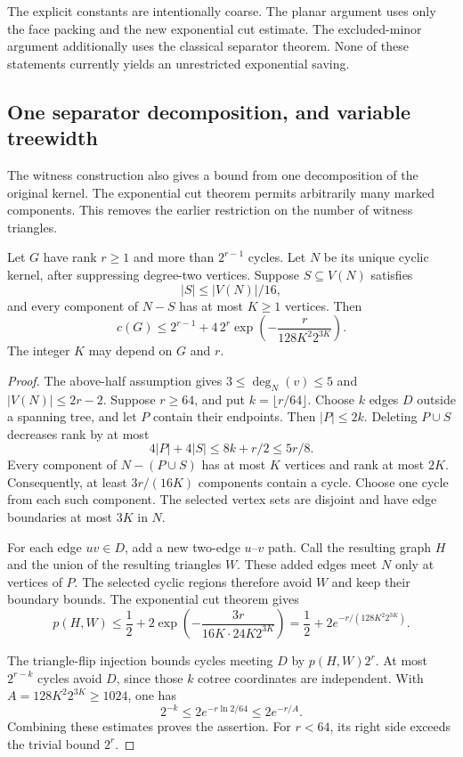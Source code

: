 The explicit constants are intentionally coarse.
The planar argument uses only the face packing and the new exponential cut estimate.
The excluded-minor argument additionally uses the classical separator theorem.
None of these statements currently yields an unrestricted exponential saving.

\subsection{One separator decomposition, and variable treewidth}

The witness construction also gives a bound from one decomposition of the original kernel.
The exponential cut theorem permits arbitrarily many marked components.
This removes the earlier restriction on the number of witness triangles.

\begin{proposition}
\label{prop:one-decomposition-exponential}
Let $G$ have rank $r\ge1$ and more than $2^{r-1}$ cycles.
Let $N$ be its unique cyclic kernel, after suppressing degree-two vertices.
Suppose $S\subseteq V(N)$ satisfies
\[
 |S|\le |V(N)|/16,
\]
and every component of $N-S$ has at most $K\ge1$ vertices.
Then
\[
 c(G)\le2^{r-1}+4\,2^r
 \exp\!\left(-\frac{r}{128K^2 2^{3K}}\right).
\]
The integer $K$ may depend on $G$ and $r$.
\end{proposition}

\begin{proof}
The above-half assumption gives $3\le\deg_N(v)\le5$ and $|V(N)|\le2r-2$.
Suppose $r\ge64$, and put $k=\lfloor r/64\rfloor$.
Choose $k$ edges $D$ outside a spanning tree, and let $P$ contain their endpoints.
Then $|P|\le2k$.
Deleting $P\cup S$ decreases rank by at most
\[
 4|P|+4|S|\le8k+r/2\le5r/8.
\]
Every component of $N-(P\cup S)$ has at most $K$ vertices and rank at most $2K$.
Consequently, at least $3r/(16K)$ components contain a cycle.
Choose one cycle from each such component.
The selected vertex sets are disjoint and have edge boundaries at most $3K$ in $N$.

For each edge $uv\in D$, add a new two-edge $u$--$v$ path.
Call the resulting graph $H$ and the union of the resulting triangles $W$.
These added edges meet $N$ only at vertices of $P$.
The selected cyclic regions therefore avoid $W$ and keep their boundary bounds.
The exponential cut theorem gives
\[
 p(H,W)\le\frac12+
 2\exp\!\left(-\frac{3r}{16K\cdot24K2^{3K}}\right)
 =\frac12+2e^{-r/(128K^2 2^{3K})}.
\]

The triangle-flip injection bounds cycles meeting $D$ by $p(H,W)2^r$.
At most $2^{r-k}$ cycles avoid $D$, since those $k$ cotree coordinates are independent.
With $A=128K^2 2^{3K}\ge1024$, one has
\[
 2^{-k}\le2e^{-r\ln2/64}\le2e^{-r/A}.
\]
Combining these estimates proves the assertion.
For $r<64$, its right side exceeds the trivial bound $2^r$.
\end{proof}

